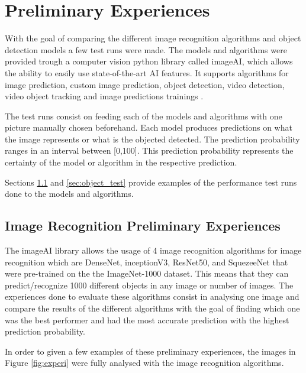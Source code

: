 \newpage


  
  \section{Preliminary Experiences}
  \label{sec:testruns}

   With the goal of comparing the different image recognition algorithms and object detection models a few test runs were made. The models and algorithms were provided trough a computer vision python library called imageAI, which allows the ability to easily use state-of-the-art AI features. It supports algorithms for image prediction, custom image prediction, object detection, video detection, video object tracking and image predictions trainings \cite{ImageAI}.

  The test runs consist on feeding each of the models and algorithms with one picture manually chosen beforehand. Each model produces predictions on what the image represents or what is the objected detected. The prediction probability ranges in an interval between [0,100]. This prediction probability represents the certainty of the model or algorithm in the respective prediction.


  \par Sections \ref{sec:image_test} and \ref{sec:object_test} provide examples of the performance test runs done to the models and algorithms.

  \subsection{Image Recognition Preliminary Experiences}
  \label{sec:image_test}


  The imageAI library allows the usage of 4 image recognition algorithms for image recognition which are DenseNet, inceptionV3, ResNet50, and SquezeeNet that were pre-trained on the the ImageNet-1000 dataset. This means that they can  predict/recognize 1000 different objects in any image or number of images. The experiences done to evaluate these algorithms consist in analysing one image and compare the results of the different algorithms with the goal of finding which one was the best performer and had the most accurate prediction with the highest prediction probability.
 
  In order to given a few examples of these preliminary experiences, the images in Figure \ref{fig:experi} were fully analysed with the image recognition algorithms.



